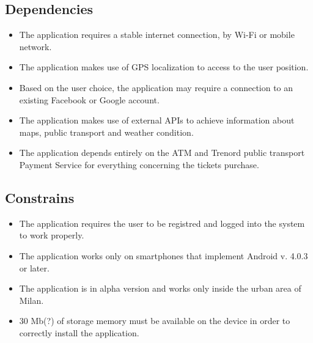 \subsection{Dependencies}
\begin{itemize}
	\item The application requires a stable internet connection, by Wi-Fi or mobile network.
	\item The application makes use of GPS localization to access to the user position.
	\item Based on the user choice, the application may require a connection to an existing Facebook or Google account.
	\item The application makes use of external APIs to achieve information about maps, public transport and weather condition.
	\item The application depends entirely on the ATM and Trenord public transport Payment Service for everything concerning the tickets purchase.
\end{itemize}
\subsection{Constrains}
\begin{itemize}
	\item The application requires the user to be registred and logged into the system to work properly.
	\item The application works only on smartphones that implement Android v. 4.0.3 or later.
	\item The application is in alpha version and works only inside the urban area of Milan.
	\item 30 Mb(?) of storage memory must be available on the device in order to correctly install the application.
\end{itemize}


